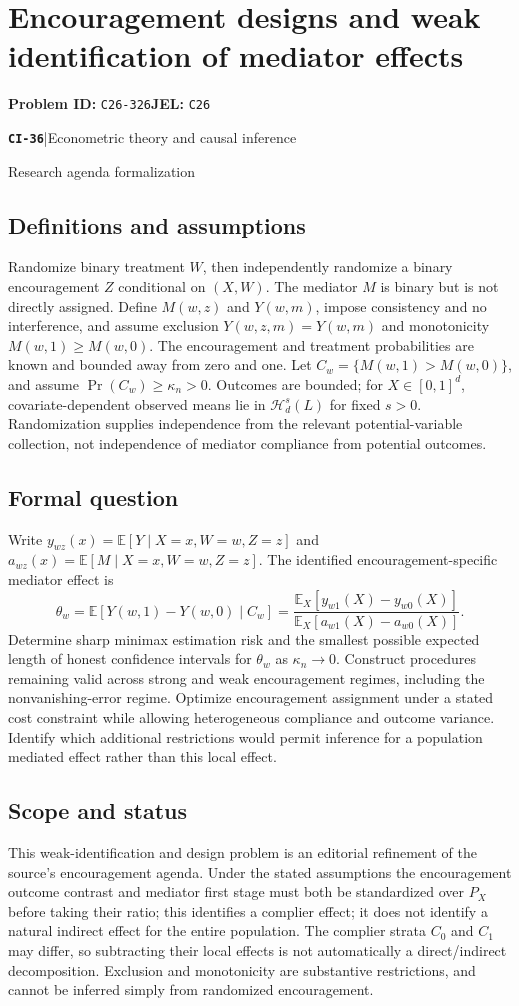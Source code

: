 \documentclass[11pt,a4paper]{article}
\newcommand{\E}{\mathbb E}
\newcommand{\entrymeta}[3]{{\sffamily\small\color{muted}\textbf{\texttt{#1}}\quad|\quad #2\par #3\par}}
\begin{document}
\section*{Encouragement designs and weak identification of mediator effects}
\textbf{Problem ID:} \texttt{C26-326}\quad \textbf{JEL:} \texttt{C26}\par
\label{problem:OP-0515}
\label{beyond:CI-36}
\entrymeta{CI-36}{Econometric theory and causal inference}{Research agenda formalization}
\subsection*{Definitions and assumptions}
Randomize binary treatment $W$, then independently randomize a binary encouragement $Z$ conditional on $(X,W)$. The mediator $M$ is binary but is not directly assigned. Define $M(w,z)$ and $Y(w,m)$, impose consistency and no interference, and assume exclusion $Y(w,z,m)=Y(w,m)$ and monotonicity $M(w,1)\geq M(w,0)$. The encouragement and treatment probabilities are known and bounded away from zero and one. Let $C_w=\{M(w,1)>M(w,0)\}$, and assume $\Pr(C_w)\geq\kappa_n>0$. Outcomes are bounded; for $X\in[0,1]^d$, covariate-dependent observed means lie in $\mathcal H_d^s(L)$ for fixed $s>0$. Randomization supplies independence from the relevant potential-variable collection, not independence of mediator compliance from potential outcomes.
\subsection*{Formal question}
Write $y_{wz}(x)=\E[Y\mid X=x,W=w,Z=z]$ and $a_{wz}(x)=\E[M\mid X=x,W=w,Z=z]$. The identified encouragement-specific mediator effect is
\[
 \theta_w=\E[Y(w,1)-Y(w,0)\mid C_w]
 =\frac{\E_X[y_{w1}(X)-y_{w0}(X)]}{\E_X[a_{w1}(X)-a_{w0}(X)]}.
\]
Determine sharp minimax estimation risk and the smallest possible expected length of honest confidence intervals for $\theta_w$ as $\kappa_n\to0$. Construct procedures remaining valid across strong and weak encouragement regimes, including the nonvanishing-error regime. Optimize encouragement assignment under a stated cost constraint while allowing heterogeneous compliance and outcome variance. Identify which additional restrictions would permit inference for a population mediated effect rather than this local effect.
\subsection*{Scope and status}
This weak-identification and design problem is an editorial refinement of the source's encouragement agenda. Under the stated assumptions the encouragement outcome contrast and mediator first stage must both be standardized over $P_X$ before taking their ratio; this identifies a complier effect; it does not identify a natural indirect effect for the entire population. The complier strata $C_0$ and $C_1$ may differ, so subtracting their local effects is not automatically a direct/indirect decomposition. Exclusion and monotonicity are substantive restrictions, and cannot be inferred simply from randomized encouragement.
\end{document}
